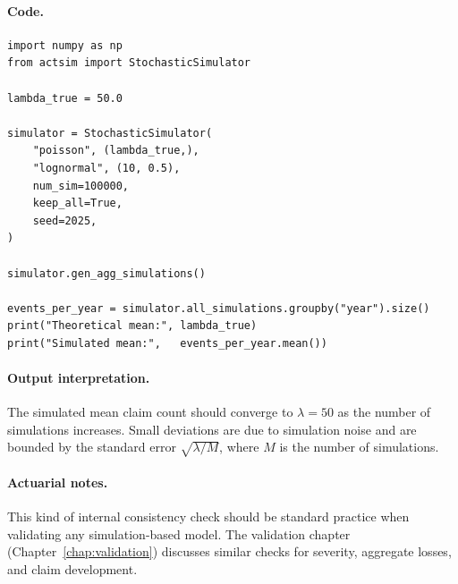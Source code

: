 \paragraph{Code.}
\begin{lstlisting}[style=pythonstyle]
import numpy as np
from actsim import StochasticSimulator

lambda_true = 50.0

simulator = StochasticSimulator(
    "poisson", (lambda_true,),
    "lognormal", (10, 0.5),
    num_sim=100000,
    keep_all=True,
    seed=2025,
)

simulator.gen_agg_simulations()

events_per_year = simulator.all_simulations.groupby("year").size()
print("Theoretical mean:", lambda_true)
print("Simulated mean:",   events_per_year.mean())
\end{lstlisting}

\paragraph{Output interpretation.} The simulated mean claim count should
converge to $\lambda = 50$ as the number of simulations increases. Small
deviations are due to simulation noise and are bounded by the standard
error $\sqrt{\lambda / M}$, where $M$ is the number of simulations.

\paragraph{Actuarial notes.} This kind of internal consistency check
should be standard practice when validating any simulation-based model.
The validation chapter (Chapter~\ref{chap:validation}) discusses similar
checks for severity, aggregate losses, and claim development.
